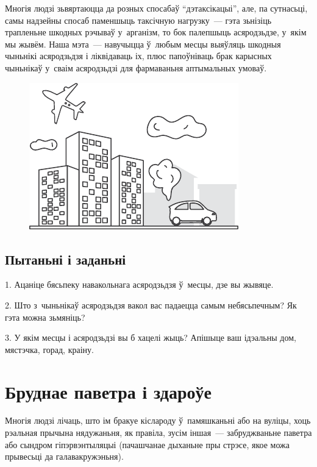 Многія людзі зьвяртаюцца да розных спосабаў ``дэтаксікацыі'', але, па сутнасьці, самы надзейны спосаб паменшыць таксічную нагрузку~--- гэта зьнізіць трапленьне шкодных рэчываў у~арганізм, то бок палепшыць асяродзьдзе, у~якім мы жывём. Наша мэта~--- навучыцца ў~любым месцы выяўляць шкодныя чыньнікі асяродзьдзя і ліквідаваць іх, плюс папоўніваць брак карысных чыньнікаў у~сваім асяродзьдзі для фармаваньня аптымальных умоваў.

\begin{figure}[htb!]
  \centering
  \includegraphics[scale=1.3]{willpower/ch11/2.pdf}
\end{figure}

\subsection*{Пытаньні і заданьні}

1. Ацаніце бясьпеку навакольнага асяродзьдзя ў~месцы, дзе вы жывяце.

2. Што з~чыньнікаў асяродзьдзя вакол вас падаецца самым небясьпечным? Як гэта можна зьмяніць?

3. У якім месцы і асяродзьдзі вы б хацелі жыць? Апішыце ваш ідэальны дом, мястэчка, горад, краіну.


\section{Бруднае паветра і здароўе}

Многія людзі лічаць, што ім бракуе кіслароду ў~памяшканьні або на вуліцы, хоць рэальная прычына нядужаньня, як правіла, зусім іншая~--- забруджваньне паветра або сындром гіпэрвэнтыляцыі (пачашчанае дыханьне пры стрэсе, якое можа прывесьці да галавакружэньня).


